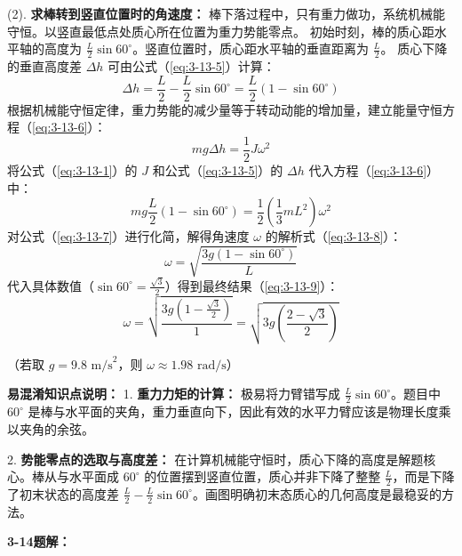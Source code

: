 (2). \textbf{求棒转到竖直位置时的角速度：}
棒下落过程中，只有重力做功，系统机械能守恒。以竖直最低点处质心所在位置为重力势能零点。
初始时刻，棒的质心距水平轴的高度为 $\frac{L}{2} \sin 60^\circ$。竖直位置时，质心距水平轴的垂直距离为 $\frac{L}{2}$。
质心下降的垂直高度差 $\Delta h$ 可由公式（\ref{eq:3-13-5}）计算：
\begin{equation}\label{eq:3-13-5}
	\Delta h = \frac{L}{2} - \frac{L}{2} \sin 60^\circ = \frac{L}{2}(1 - \sin 60^\circ)
\end{equation}
根据机械能守恒定律，重力势能的减少量等于转动动能的增加量，建立能量守恒方程（\ref{eq:3-13-6}）：
\begin{equation}\label{eq:3-13-6}
	mg \Delta h = \frac{1}{2} J \omega^2
\end{equation}
将公式（\ref{eq:3-13-1}）的 $J$ 和公式（\ref{eq:3-13-5}）的 $\Delta h$ 代入方程（\ref{eq:3-13-6}）中：
\begin{equation}\label{eq:3-13-7}
	mg \frac{L}{2}(1 - \sin 60^\circ) = \frac{1}{2} \left(\frac{1}{3}mL^2\right) \omega^2
\end{equation}
对公式（\ref{eq:3-13-7}）进行化简，解得角速度 $\omega$ 的解析式（\ref{eq:3-13-8}）：
\begin{equation}\label{eq:3-13-8}
	\omega = \sqrt{\frac{3g(1 - \sin 60^\circ)}{L}}
\end{equation}
代入具体数值（$\sin 60^\circ = \frac{\sqrt{3}}{2}$）得到最终结果（\ref{eq:3-13-9}）：
\begin{equation}\label{eq:3-13-9}
	\omega = \sqrt{\frac{3g(1 - \frac{\sqrt{3}}{2})}{1}} = \sqrt{3g \left(\frac{2-\sqrt{3}}{2}\right)}
\end{equation}

（若取 $g = 9.8\text{ m/s}^2$，则 $\omega \approx 1.98\text{ rad/s}$）

\vspace{1em}

\textbf{易混淆知识点说明：}
1. \textbf{重力力矩的计算：} 极易将力臂错写成 $\frac{L}{2} \sin 60^\circ$。题目中 $60^\circ$ 是棒与水平面的夹角，重力垂直向下，因此有效的水平力臂应该是物理长度乘以夹角的余弦。

2. \textbf{势能零点的选取与高度差：} 在计算机械能守恒时，质心下降的高度是解题核心。棒从与水平面成 $60^\circ$ 的位置摆到竖直位置，质心并非下降了整整 $\frac{L}{2}$，而是下降了初末状态的高度差 $\frac{L}{2} - \frac{L}{2} \sin 60^\circ$。画图明确初末态质心的几何高度是最稳妥的方法。

\vspace{2em}

\textbf{3-14题解：}
\setcounter{equation}{0}
\renewcommand{\theHequation}{3-14.\arabic{equation}}

